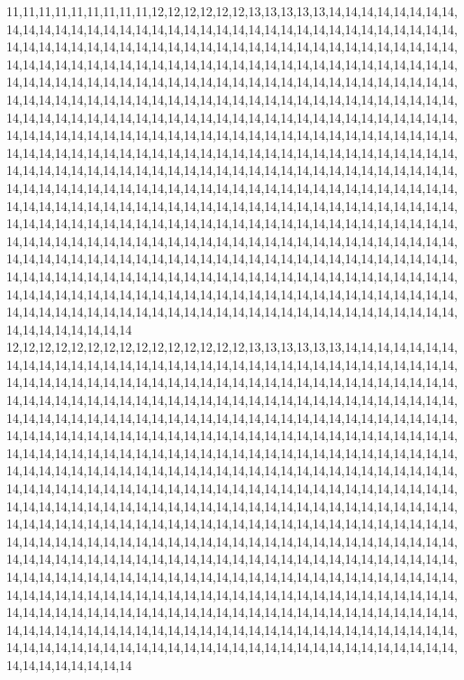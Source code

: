 11,11,11,11,11,11,11,11,11,12,12,12,12,12,12,13,13,13,13,13,14,14,14,14,14,14,14,14,14,14,14,14,14,14,14,14,14,14,14,14,14,14,14,14,14,14,14,14,14,14,14,14,14,14,14,14,14,14,14,14,14,14,14,14,14,14,14,14,14,14,14,14,14,14,14,14,14,14,14,14,14,14,14,14,14,14,14,14,14,14,14,14,14,14,14,14,14,14,14,14,14,14,14,14,14,14,14,14,14,14,14,14,14,14,14,14,14,14,14,14,14,14,14,14,14,14,14,14,14,14,14,14,14,14,14,14,14,14,14,14,14,14,14,14,14,14,14,14,14,14,14,14,14,14,14,14,14,14,14,14,14,14,14,14,14,14,14,14,14,14,14,14,14,14,14,14,14,14,14,14,14,14,14,14,14,14,14,14,14,14,14,14,14,14,14,14,14,14,14,14,14,14,14,14,14,14,14,14,14,14,14,14,14,14,14,14,14,14,14,14,14,14,14,14,14,14,14,14,14,14,14,14,14,14,14,14,14,14,14,14,14,14,14,14,14,14,14,14,14,14,14,14,14,14,14,14,14,14,14,14,14,14,14,14,14,14,14,14,14,14,14,14,14,14,14,14,14,14,14,14,14,14,14,14,14,14,14,14,14,14,14,14,14,14,14,14,14,14,14,14,14,14,14,14,14,14,14,14,14,14,14,14,14,14,14,14,14,14,14,14,14,14,14,14,14,14,14,14,14,14,14,14,14,14,14,14,14,14,14,14,14,14,14,14,14,14,14,14,14,14,14,14,14,14,14,14,14,14,14,14,14,14,14,14,14,14,14,14,14,14,14,14,14,14,14,14,14,14,14,14,14,14,14,14,14,14,14,14,14,14,14,14,14,14,14,14,14,14,14,14,14,14,14,14,14,14,14,14,14,14,14,14,14,14,14,14,14,14,14,14,14,14,14,14,14,14,14,14,14,14,14,14,14,14,14,14,14,14,14,14,14,14,14,14,14,14,14,14,14,14,14,14,14,14,14,14,14,14,14,14,14,14,14,14,14,14,14,14,14,14,14,14,14,14,14,14,14,14,14,14,14,14,14,14,14,14,14,14,14,14,14,14,14,14,14,14,14,14,14,14,14,14,14,14,14,14,14,14,14,14,14,14
12,12,12,12,12,12,12,12,12,12,12,12,12,12,12,13,13,13,13,13,13,14,14,14,14,14,14,14,14,14,14,14,14,14,14,14,14,14,14,14,14,14,14,14,14,14,14,14,14,14,14,14,14,14,14,14,14,14,14,14,14,14,14,14,14,14,14,14,14,14,14,14,14,14,14,14,14,14,14,14,14,14,14,14,14,14,14,14,14,14,14,14,14,14,14,14,14,14,14,14,14,14,14,14,14,14,14,14,14,14,14,14,14,14,14,14,14,14,14,14,14,14,14,14,14,14,14,14,14,14,14,14,14,14,14,14,14,14,14,14,14,14,14,14,14,14,14,14,14,14,14,14,14,14,14,14,14,14,14,14,14,14,14,14,14,14,14,14,14,14,14,14,14,14,14,14,14,14,14,14,14,14,14,14,14,14,14,14,14,14,14,14,14,14,14,14,14,14,14,14,14,14,14,14,14,14,14,14,14,14,14,14,14,14,14,14,14,14,14,14,14,14,14,14,14,14,14,14,14,14,14,14,14,14,14,14,14,14,14,14,14,14,14,14,14,14,14,14,14,14,14,14,14,14,14,14,14,14,14,14,14,14,14,14,14,14,14,14,14,14,14,14,14,14,14,14,14,14,14,14,14,14,14,14,14,14,14,14,14,14,14,14,14,14,14,14,14,14,14,14,14,14,14,14,14,14,14,14,14,14,14,14,14,14,14,14,14,14,14,14,14,14,14,14,14,14,14,14,14,14,14,14,14,14,14,14,14,14,14,14,14,14,14,14,14,14,14,14,14,14,14,14,14,14,14,14,14,14,14,14,14,14,14,14,14,14,14,14,14,14,14,14,14,14,14,14,14,14,14,14,14,14,14,14,14,14,14,14,14,14,14,14,14,14,14,14,14,14,14,14,14,14,14,14,14,14,14,14,14,14,14,14,14,14,14,14,14,14,14,14,14,14,14,14,14,14,14,14,14,14,14,14,14,14,14,14,14,14,14,14,14,14,14,14,14,14,14,14,14,14,14,14,14,14,14,14,14,14,14,14,14,14,14,14,14,14,14,14,14,14,14,14,14,14,14,14,14,14,14,14,14,14,14,14,14,14,14,14,14,14,14,14,14,14,14,14,14,14,14,14,14,14,14,14,14,14,14,14,14,14,14,14
